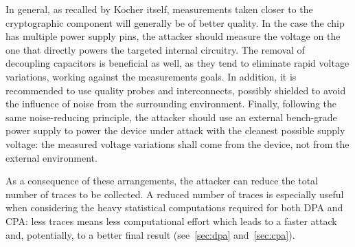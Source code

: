             

            In general, as recalled by Kocher itself, measurements taken closer to the cryptographic component will generally be of better quality. In the case the chip has multiple power supply pins, the attacker should measure the voltage on the one that directly powers the targeted internal circuitry. The removal of decoupling capacitors is beneficial as well, as they tend to eliminate rapid voltage variations, working against the measurements goals. In addition, it is recommended to use quality probes and interconnects, possibly shielded to avoid the influence of noise from the surrounding environment. Finally, following the same noise-reducing principle, the attacker should use an external bench-grade power supply to power the device under attack with the cleanest possible supply voltage: the measured voltage variations shall come from the device, not from the external environment.

            As a consequence of these arrangements, the attacker can reduce the total number of traces to be collected. A reduced number of traces is especially useful when considering the heavy statistical computations required for both DPA and CPA: less traces means less computational effort which leads to a faster attack and, potentially, to a better final result (see~\ref{sec:dpa} and~\ref{sec:cpa}).
        

